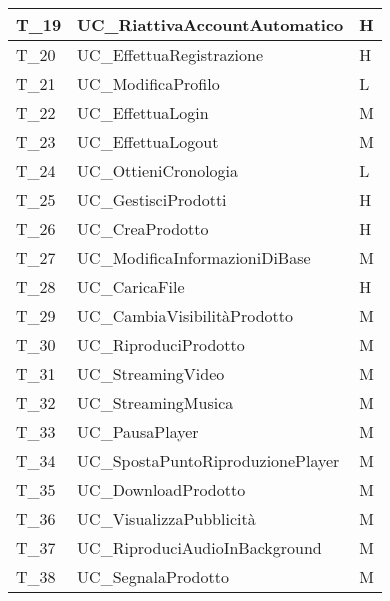 \begin{longtable}{| p{} | p{} | p{} |}
    T\_19            & UC\_RiattivaAccountAutomatico         & H                 \\\hline
    T\_20            & UC\_EffettuaRegistrazione             & H                 \\\hline
    T\_21            & UC\_ModificaProfilo                   & L                 \\\hline
    T\_22            & UC\_EffettuaLogin                     & M                 \\\hline
    T\_23            & UC\_EffettuaLogout                    & M                 \\\hline
    T\_24            & UC\_OttieniCronologia                 & L                 \\\hline
    T\_25            & UC\_GestisciProdotti                  & H                 \\\hline
    T\_26            & UC\_CreaProdotto                      & H                 \\\hline
    T\_27            & UC\_ModificaInformazioniDiBase        & M                 \\\hline
    T\_28            & UC\_CaricaFile                        & H                 \\\hline
    T\_29            & UC\_CambiaVisibilitàProdotto          & M                 \\\hline
    T\_30            & UC\_RiproduciProdotto                 & M                 \\\hline
    T\_31            & UC\_StreamingVideo                    & M                 \\\hline
    T\_32            & UC\_StreamingMusica                   & M                 \\\hline
    T\_33            & UC\_PausaPlayer                       & M                 \\\hline
    T\_34            & UC\_SpostaPuntoRiproduzionePlayer     & M                 \\\hline
    T\_35            & UC\_DownloadProdotto                  & M                 \\\hline
    T\_36            & UC\_VisualizzaPubblicità              & M                 \\\hline
    T\_37            & UC\_RiproduciAudioInBackground        & M                 \\\hline
    T\_38            & UC\_SegnalaProdotto                   & M                 \\\hline

\end{longtable}
